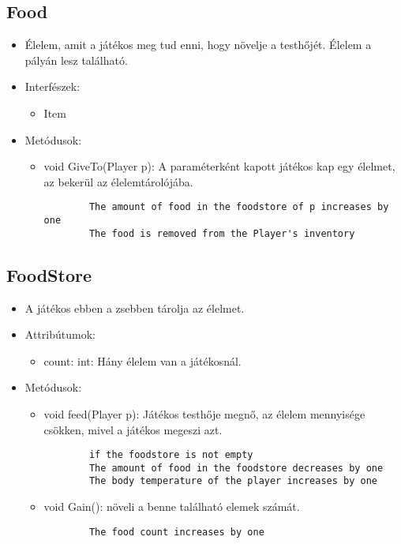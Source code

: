 \subsection{Food}
\begin{itemize}
	\item Élelem, amit a játékos meg tud enni, hogy növelje a testhőjét. Élelem a pályán lesz található.
	\item Interfészek:
	\begin{itemize}
		\item Item
	\end{itemize}
	\item Metódusok:
	\begin{itemize}
		\item void GiveTo(Player p): A paraméterként kapott játékos kap egy élelmet, az bekerül az élelemtárolójába.
		\begin{lstlisting}
		The amount of food in the foodstore of p increases by one
		The food is removed from the Player's inventory
		\end{lstlisting}
	\end{itemize}
\end{itemize}

\subsection{FoodStore}
\begin{itemize}
	\item A játékos ebben a zsebben tárolja az élelmet.
	\item Attribútumok:
	\begin{itemize}
		\item count: int: Hány élelem van a játékosnál.
	\end{itemize}
	\item Metódusok:
	\begin{itemize}
		\item void feed(Player p): Játékos testhője megnő, az élelem mennyisége csökken, mivel a játékos megeszi azt.
		\begin{lstlisting}
		if the foodstore is not empty
		The amount of food in the foodstore decreases by one
		The body temperature of the player increases by one
		\end{lstlisting}
		\item void Gain(): növeli a benne található elemek számát.
		\begin{lstlisting}
		The food count increases by one
		\end{lstlisting}
	\end{itemize}
\end{itemize}

